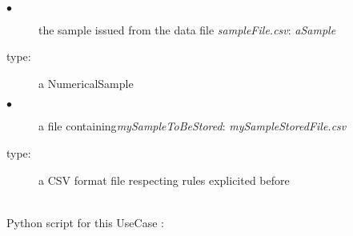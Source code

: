 \textspace\\
             {
               \begin{description}
               \item[$\bullet$] the sample issued from the data file {\itshape sampleFile.csv}: {\itshape aSample}
               \item[type:]  a NumericalSample
               \item[$\bullet$]  a file containing{\itshape mySampleToBeStored}: {\itshape mySampleStoredFile.csv}
               \item[type:]  a CSV format file respecting rules explicited before
               \end{description}
             }

             \textspace\\
             Python script for this UseCase :

